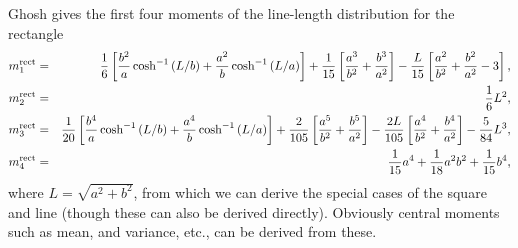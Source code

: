 Ghosh \cite{b.ghosh51:_random_rect} gives the first four moments of
the line-length distribution for the rectangle
\begin{eqnarray}
  \label{eq:rect_moments} 
  m^{\rm rect}_1 & = & \frac{1}{6} \left[ 
                        \frac{b^2}{a} \cosh^{-1}\left( L/b \right) +
                        \frac{a^2}{b} \cosh^{-1}\left( L/a \right) 
                 \right]
                  + \frac{1}{15} \left[ \frac{a^3}{b^2} + \frac{b^3}{a^2} \right]
                  - \frac{L}{15} \left[ \frac{a^2}{b^2} + \frac{b^2}{a^2} -3 \right],
\\
  m^{\rm rect}_2 & = & \frac{1}{6} L^2, \\
  m^{\rm rect}_3 & = & \frac{1}{20} \left[ 
                        \frac{b^4}{a} \cosh^{-1}\left( L/b \right) +
                        \frac{a^4}{b} \cosh^{-1}\left( L/a \right) 
                 \right]
                  + \frac{2}{105} \left[ \frac{a^5}{b^2} + \frac{b^5}{a^2} \right]
                  - \frac{2L}{105} \left[ \frac{a^4}{b^2} + \frac{b^4}{a^2}\right]
                        - \frac{5}{84} L^3, 
\\
  m^{\rm rect}_4 & = & \frac{1}{15} a^4 + \frac{1}{18} a^2 b^2 + \frac{1}{15} b^4,
  \label{eq:rect_moments_end} 
\end{eqnarray}
where $L = \sqrt{a^2 + b^2}$, from which we can derive the special
cases of the square and line (though these can also be derived
directly). Obviously central moments such as mean, and variance, etc.,
can be derived from these. 
